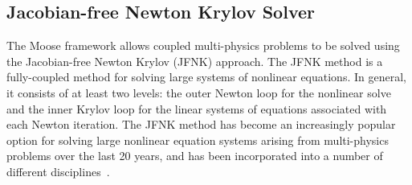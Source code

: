 \subsection{Jacobian-free Newton Krylov Solver\label{sec:jfnk}}
The Moose framework allows coupled multi-physics problems to be solved using the
Jacobian-free Newton Krylov (JFNK) approach. 
The JFNK method is a fully-coupled method for solving large systems of
nonlinear equations. In general, it consists of at least two
levels: the outer Newton loop for the nonlinear solve and the inner
Krylov loop for the linear systems of equations associated with each Newton
iteration.  The JFNK method has become an increasingly popular option
for solving large nonlinear equation systems arising from
multi-physics problems over the last 20 years, and has been incorporated
into a number of different disciplines~\cite{Knoll_2004}.

